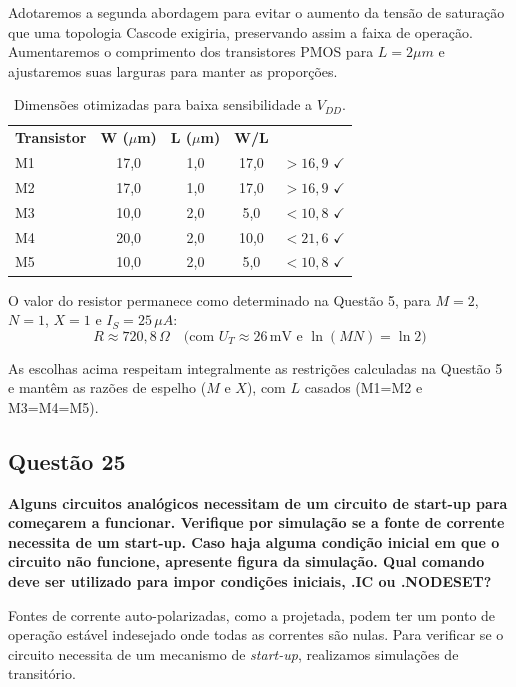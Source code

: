 ﻿\documentclass[12pt,a4paper]{article}
\begin{document}
Adotaremos a segunda abordagem para evitar o aumento da tensão de saturação que uma topologia Cascode exigiria, preservando assim a faixa de operação. Aumentaremos o comprimento dos transistores PMOS para $L=2\mu m$ e ajustaremos suas larguras para manter as proporções.

\begin{table}[H]
\centering
\caption{Dimensões otimizadas para baixa sensibilidade a $V_{DD}$.}
\label{tab:dimensoes_otimizadas}
\begin{tabular}{@{}lcccc@{}}
\toprule
\textbf{Transistor} & \textbf{W ($\mu$m)} & \textbf{L ($\mu$m)} & \textbf{W/L} \\
M1 & 17,0 & 1,0 & 17,0 & $> 16,9$ $\checkmark$ \\
M2 & 17,0 & 1,0 & 17,0 & $> 16,9$ $\checkmark$ \\
M3 & 10,0 & 2,0 & 5,0 & $< 10,8$ $\checkmark$ \\
M4 & 20,0 & 2,0 & 10,0 & $< 21,6$ $\checkmark$ \\
M5 & 10,0 & 2,0 & 5,0 & $< 10,8$ $\checkmark$ \\
\bottomrule
\bottomrule
\end{tabular}
\end{table}
O valor do resistor permanece como determinado na Questão 5, para $M=2$, $N=1$, $X=1$ e $I_S=25\,\mu A$:
\begin{equation*}
R \approx 720{,}8\,\Omega \quad \text{(com } U_T \approx 26\,\text{mV e }\ln(MN)=\ln 2\text{)}
\end{equation*}

As escolhas acima respeitam integralmente as restrições calculadas na Questão 5 e mantêm as razões de espelho ($M$ e $X$), com $L$ casados (M1=M2 e M3=M4=M5).
\subsection*{Questão 25}

\textbf{Alguns circuitos analógicos necessitam de um circuito de start-up para começarem a funcionar. Verifique por simulação se a fonte de corrente necessita de um start-up. Caso haja alguma condição inicial em que o circuito não funcione, apresente figura da simulação. Qual comando deve ser utilizado para impor condições iniciais, .IC ou .NODESET?}

Fontes de corrente auto-polarizadas, como a projetada, podem ter um ponto de operação estável indesejado onde todas as correntes são nulas. Para verificar se o circuito necessita de um mecanismo de \textit{start-up}, realizamos simulações de transitório.
\end{document}
